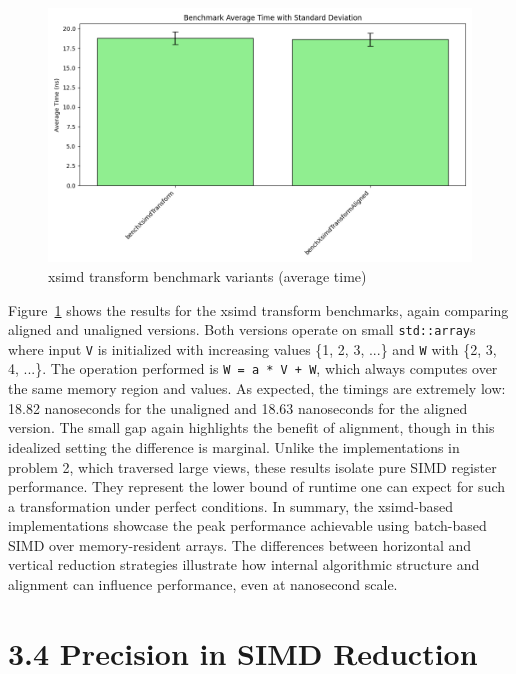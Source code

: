 \begin{figure}[h!]
    \centering
    \includegraphics[width=0.9\linewidth]{img/simd_transformVX_output.txt_ex02.png}
    \caption{xsimd transform benchmark variants (average time)}
    \label{fig:simd_transformVX_output}
\end{figure}

Figure~\ref{fig:simd_transformVX_output} shows the results for the xsimd transform benchmarks, again comparing aligned and unaligned versions.
Both versions operate on small \texttt{std::array}s where input \texttt{V} is initialized with increasing values \{1, 2, 3, ...\} and \texttt{W} with \{2, 3, 4, ...\}.
The operation performed is \texttt{W = a * V + W}, which always computes over the same memory region and values.
As expected, the timings are extremely low: 18.82 nanoseconds for the unaligned and 18.63 nanoseconds for the aligned version.
The small gap again highlights the benefit of alignment, though in this idealized setting the difference is marginal.
Unlike the implementations in problem 2, which traversed large views, these results isolate pure SIMD register performance.
They represent the lower bound of runtime one can expect for such a transformation under perfect conditions.
In summary, the xsimd-based implementations showcase the peak performance achievable using batch-based SIMD over memory-resident arrays.
The differences between horizontal and vertical reduction strategies illustrate how internal algorithmic structure and alignment can influence performance, even at nanosecond scale.

\pagebreak

\section*{3.4 Precision in SIMD Reduction}

